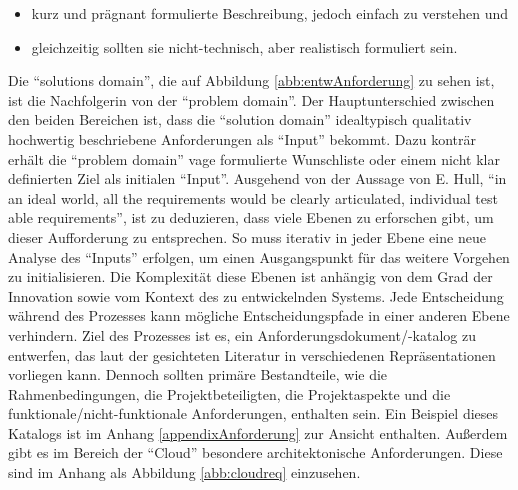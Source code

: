 \begin{itemize}
	\item kurz und prägnant formulierte Beschreibung, jedoch einfach zu verstehen und
	\item gleichzeitig sollten sie nicht-technisch, aber realistisch formuliert sein.
\end{itemize}
 
 Die \enquote{solutions domain}, die auf Abbildung \vref{abb:entwAnforderung} zu sehen ist, ist die Nachfolgerin von der \enquote{problem domain}. Der Hauptunterschied zwischen den beiden Bereichen ist, dass die \enquote{solution domain} idealtypisch qualitativ hochwertig beschriebene Anforderungen als \enquote{Input} bekommt. Dazu konträr erhält die \enquote{problem domain} vage formulierte Wunschliste oder einem nicht klar definierten Ziel als initialen \enquote{Input}. Ausgehend von der Aussage von E. Hull, \enquote{in an ideal world, all the requirements would be clearly articulated, individual test able requirements}\autocite[][S.\,115]{hull_requirements_2011}, ist zu deduzieren, dass viele Ebenen zu erforschen gibt, um dieser Aufforderung zu entsprechen. So muss iterativ in jeder Ebene eine neue Analyse des \enquote{Inputs} erfolgen, um einen Ausgangspunkt für das weitere Vorgehen zu initialisieren. Die Komplexität diese Ebenen ist anhängig von dem Grad der Innovation sowie vom Kontext des zu entwickelnden Systems. Jede Entscheidung während des Prozesses kann mögliche Entscheidungspfade in einer anderen Ebene verhindern. Ziel des Prozesses ist es, ein Anforderungsdokument/-katalog zu entwerfen, das laut der gesichteten Literatur in verschiedenen Repräsentationen vorliegen kann. Dennoch sollten primäre Bestandteile, wie die Rahmenbedingungen, die Projektbeteiligten, die Projektaspekte und die funktionale/nicht-funktionale Anforderungen, enthalten sein. Ein Beispiel dieses Katalogs ist im Anhang \vref{appendixAnforderung} zur Ansicht enthalten. Außerdem gibt es im Bereich der \enquote{Cloud} besondere architektonische Anforderungen. Diese sind im Anhang als Abbildung \vref{abb:cloudreq} einzusehen.
 
